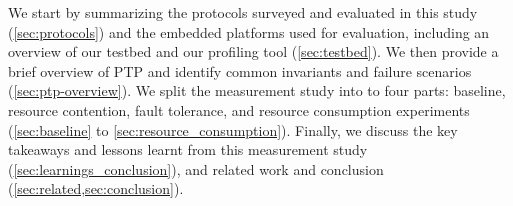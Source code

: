 

%

We start by summarizing the protocols surveyed and evaluated in this study (\cref{sec:protocols})
and the embedded platforms used for evaluation, including an overview of our testbed and our profiling tool \toolName{} (\cref{sec:testbed}).
We then provide a brief overview of PTP and identify common invariants and failure scenarios (\cref{sec:ptp-overview}).
We split the measurement study into to four parts: baseline, resource
contention, fault tolerance, and resource consumption experiments
(\cref{sec:baseline} to \cref{sec:resource_consumption}).
Finally, we discuss the key takeaways and lessons learnt from this
measurement study
(\cref{sec:learnings_conclusion}),
and related work and conclusion (\cref{sec:related,sec:conclusion}).
